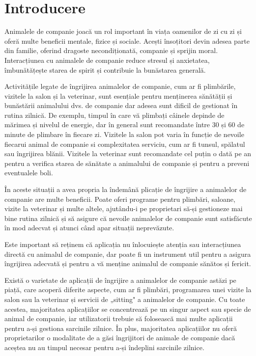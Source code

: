\chapter*{Introducere} 

Animalele de companie joacă un rol important în viața oamenilor de zi cu zi și oferă multe beneficii mentale, fizice și sociale. Acești însoțitori devin adesea parte din familie, oferind dragoste necondiționată, companie și sprijin moral. Interacțiunea cu animalele de companie  reduce stresul și anxietatea, îmbunătățește starea de spirit și contribuie la bunăstarea generală.

Activitățile legate de îngrijirea animalelor de companie, cum ar fi plimbările, vizitele la salon și la veterinar, sunt esențiale pentru menținerea sănătății și bunăstării animalului dvs. de companie dar adesea sunt dificil de gestionat în rutina zilnică. De exemplu, timpul în care vă plimbați câinele depinde de mărimea și nivelul de energie, dar în general sunt recomandate între 30 și 60 de minute de plimbare în fiecare zi. Vizitele la salon pot varia în funcție de nevoile  fiecarui animal de companie si complexitatea serviciu, cum ar fi tunsul, spălatul sau îngrijirea blănii. Vizitele la veterinar sunt recomandate cel puțin o dată pe an pentru a verifica starea de sănătate a animalului de companie și pentru a preveni eventualele boli.

În aceste situații a avea propria la îndemână plicație de îngrijire a animalelor de companie are multe beneficii. Poate oferi programe pentru plimbări, saloane, vizite la veterinar și multe altele, ajutându-i pe proprietari să-și gestioneze mai bine rutina zilnică și să asigure că nevoile animalelor de companie sunt satisfăcute în mod adecvat și atunci când apar situații neprevăzute.

Este important să reținem că aplicația nu înlocuiește atenția sau interacțiunea directă cu animalul de companie, dar poate fi un instrument util pentru a asigura îngrijirea adecvată și pentru a vă menține animalul de companie sănătos și fericit.

Există o varietate de aplicații de îngrijire a animalelor de companie astăzi pe piață, care acoperă diferite aspecte, cum ar fi plimbări, programarea unei vizite la salon sau la veterinar și servicii de „sitting" a animalelor de companie. Cu toate acestea, majoritatea aplicațiilor se concentrează pe un singur aspect sau specie de animal de companie, iar utilizatorii trebuie să folosească mai multe aplicații pentru a-și gestiona sarcinile zilnice. În plus, majoritatea aplicațiilor nu oferă proprietarilor o modalitate de a găsi îngrijitori de animale de companie dacă aceștea nu au timpul necesar pentru a-și îndeplini sarcinile zilnice.


